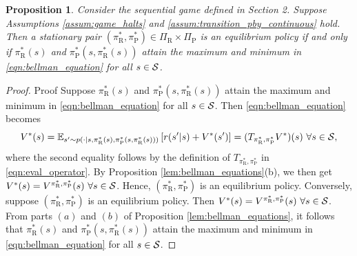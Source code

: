 \documentclass[aoas]{imsart}
\theoremstyle{plain}
\newtheorem{proposition}[theorem]{Proposition}
\theoremstyle{definition}
\begin{document}
       \begin{proposition}
           \label{lem:stationary_pol_optimal}
           Consider the sequential game defined in Section 2. Suppose Assumptions \ref{assum:game_halts} and \ref{assum:transition_pby_continuous} hold. Then a stationary pair $(\pi_\text{R}^*,\pi_\text{P}^*) \in \Pi_\text{R} \times \Pi_\text{P}$ is an equilibrium policy if and only if $\pi_\text{R}^*(s)$ and $\pi_\text{P}^*(s,\pi_\text{R}^*(s))$ attain the maximum and minimum in \eqref{eqn:bellman_equation} for all $s \in {\cal S}$.
       \end{proposition}
       \begin{proof}{Proof}
           Suppose $\pi_\text{R}^*(s)$ and $\pi_\text{P}^*(s,\pi_\text{R}^*(s))$ attain the maximum and minimum in \eqref{eqn:bellman_equation} for all $s \in {\cal S}$. Then \eqref{eqn:bellman_equation} becomes
           \[
           V^*(s) = \mathbb{E}_{s' \sim p(\cdot|s,\pi_\text{R}^*(s),\pi_\text{P}^*(s,\pi_\text{R}^*(s)))}\left[r(s'|s) + V^*(s')\right] = (T_{\pi_\text{R}^*,\pi_\text{P}^*}V^*)(s)  \ \forall s \in {\cal S},
           \]
           where the second equality follows by the definition of $T_{\pi_\text{R}^*,\pi_\text{P}^*}$ in \eqref{eqn:eval_operator}. By Proposition  \ref{lem:bellman_equations}(b), we then get $V^*(s)=V^{\pi_\text{R}^*,\pi_\text{P}^*}(s) \ \forall s \in {\cal S}$. Hence, $(\pi_\text{R}^*,\pi_\text{P}^*)$ is an equilibrium policy. Conversely, suppose $(\pi_\text{R}^*,\pi_\text{P}^*)$ is an equilibrium policy. Then $V^*(s) = V^{\pi_\text{R}^*,\pi_\text{P}^*}(s) \ \forall s \in {\cal S}$. From parts $(a)$ and $(b)$ of Proposition   \ref{lem:bellman_equations}, it follows that $\pi_\text{R}^*(s)$ and $\pi_\text{P}^*(s,\pi_\text{R}^*(s))$ attain the maximum and minimum in \eqref{eqn:bellman_equation} for all $s \in {\cal S}$.
       \end{proof}
    
\end{document}
